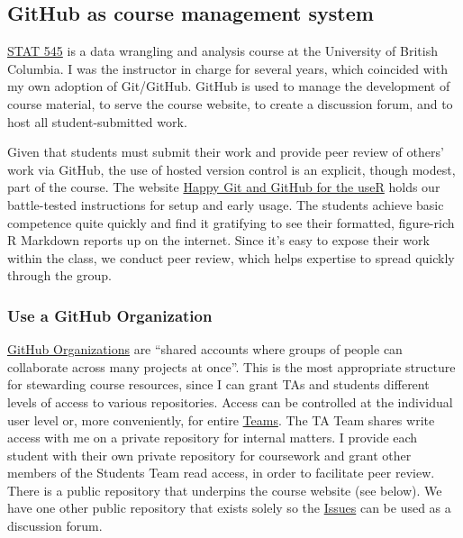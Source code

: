 \documentclass[12pt]{article}
\begin{document}
\subsection{GitHub as course management
system}\label{github-as-course-management-system}

\href{http://stat545.com}{STAT 545} is a data wrangling and analysis
course at the University of British Columbia. I was the instructor in
charge for several years, which coincided with my own adoption of
Git/GitHub. GitHub is used to manage the development of course material,
to serve the course website, to create a discussion forum, and to host
all student-submitted work.

Given that students must submit their work and provide peer review of
others' work via GitHub, the use of hosted version control is an
explicit, though modest, part of the course. The website
\href{http://happygitwithr.com}{Happy Git and GitHub for the useR} holds
our battle-tested instructions for setup and early usage. The students
achieve basic competence quite quickly and find it gratifying to see
their formatted, figure-rich R Markdown reports up on the internet.
Since it's easy to expose their work within the class, we conduct peer
review, which helps expertise to spread quickly through the group.

\subsubsection{Use a GitHub
Organization}\label{use-a-github-organization}

\href{https://help.github.com/articles/differences-between-user-and-organization-accounts/}{GitHub
Organizations} are ``shared accounts where groups of people can
collaborate across many projects at once''. This is the most appropriate
structure for stewarding course resources, since I can grant TAs and
students different levels of access to various repositories. Access can
be controlled at the individual user level or, more conveniently, for
entire \href{https://help.github.com/articles/setting-up-teams/}{Teams}.
The TA Team shares write access with me on a private repository for
internal matters. I provide each student with their own private
repository for coursework and grant other members of the Students Team
read access, in order to facilitate peer review. There is a public
repository that underpins the course website (see below). We have one
other public repository that exists solely so the
\href{https://github.com/STAT545-UBC/Discussion/issues}{Issues} can be
used as a discussion forum.
\end{document}
